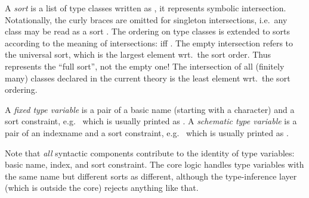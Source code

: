 \begin{isabellebody}
\begin{isamarkuptext}
  A \emph{sort} is a list of type classes written as , it represents symbolic intersection.  Notationally, the
  curly braces are omitted for singleton intersections, i.e.\ any
  class  may be read as a sort .  The ordering
  on type classes is extended to sorts according to the meaning of
  intersections:  iff .  The empty intersection \isa{{\isacharbraceleft}{\isacharbraceright}} refers to
  the universal sort, which is the largest element wrt.\ the sort
  order.  Thus \isa{{\isacharbraceleft}{\isacharbraceright}} represents the ``full sort'', not the
  empty one!  The intersection of all (finitely many) classes declared
  in the current theory is the least element wrt.\ the sort ordering.

  \medskip A \emph{fixed type variable} is a pair of a basic name
  (starting with a \isa{{\isacharprime}} character) and a sort constraint, e.g.\
   which is usually printed as .
  A \emph{schematic type variable} is a pair of an indexname and a
  sort constraint, e.g.\  which is usually
  printed as \isa{{\isacharquery}{\isasymalpha}\isactrlisub s}.

  Note that \emph{all} syntactic components contribute to the identity
  of type variables: basic name, index, and sort constraint.  The core
  logic handles type variables with the same name but different sorts
  as different, although the type-inference layer (which is outside
  the core) rejects anything like that.


\end{isamarkuptext}
\end{isabellebody}
